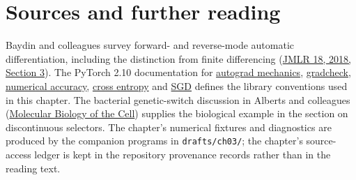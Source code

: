 \section{Sources and further reading}\label{sources-and-further-reading}

Baydin and colleagues survey forward- and reverse-mode automatic
differentiation, including the distinction from finite differencing
(\href{https://jmlr.org/papers/volume18/17-468/17-468.pdf}{JMLR 18,
2018, Section 3}). The PyTorch 2.10 documentation for
\href{https://docs.pytorch.org/docs/2.10/notes/autograd.html}{autograd
mechanics},
\href{https://docs.pytorch.org/docs/2.10/notes/gradcheck.html}{gradcheck},
\href{https://docs.pytorch.org/docs/2.10/notes/numerical_accuracy.html}{numerical
accuracy},
\href{https://docs.pytorch.org/docs/2.10/generated/torch.nn.CrossEntropyLoss.html}{cross
entropy} and
\href{https://docs.pytorch.org/docs/2.10/generated/torch.optim.SGD.html}{SGD}
defines the library conventions used in this chapter. The bacterial
genetic-switch discussion in Alberts and colleagues
(\href{https://www.ncbi.nlm.nih.gov/books/NBK26872/}{Molecular Biology
of the Cell}) supplies the biological example in the section on
discontinuous selectors. The chapter's numerical fixtures and diagnostics
are produced by the companion programs in \texttt{drafts/ch03/}; the
chapter's source-access ledger is kept in the repository provenance
records rather than in the reading text.
